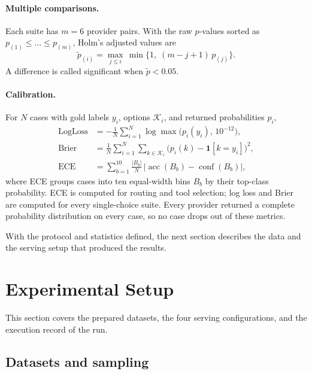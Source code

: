 \documentclass[11pt,a4paper]{article}
\begin{document}
\paragraph{Multiple comparisons.} Each suite has $m = 6$ provider pairs. With the raw $p$-values sorted
as $p_{(1)} \le \dots \le p_{(m)}$, Holm's adjusted values are
\begin{equation}\label{eq:holm}
  \tilde{p}_{(i)} = \max_{j \le i}\, \min\bigl\{1,\; (m - j + 1)\, p_{(j)}\bigr\}.
\end{equation}
A difference is called significant when $\tilde{p} < 0.05$.

\paragraph{Calibration.} For $N$ cases with gold labels $y_i$, options $\mathcal{K}_i$, and returned
probabilities $p_i$,
\begin{align}
  \text{LogLoss} &= -\frac{1}{N}\sum_{i=1}^{N} \log \max\bigl(p_i(y_i),\, 10^{-12}\bigr), \label{eq:logloss}\\
  \text{Brier}   &= \frac{1}{N}\sum_{i=1}^{N}\sum_{k \in \mathcal{K}_i} \bigl(p_i(k) - \mathbf{1}[k = y_i]\bigr)^2, \label{eq:brier}\\
  \text{ECE}     &= \sum_{b=1}^{10} \frac{|B_b|}{N}\,\bigl|\operatorname{acc}(B_b) - \operatorname{conf}(B_b)\bigr|, \label{eq:ece}
\end{align}
where ECE groups cases into ten equal-width bins $B_b$ by their top-class probability. ECE is computed
for routing and tool selection; log loss and Brier are computed for every single-choice suite. Every
provider returned a complete probability distribution on every case, so no case drops out of these
metrics.

With the protocol and statistics defined, the next section describes the data and the serving setup
that produced the results.

\section{Experimental Setup}\label{sec:experiments}

This section covers the prepared datasets, the four serving configurations, and the execution record
of the run.

\subsection{Datasets and sampling}\label{sec:data}
\end{document}
